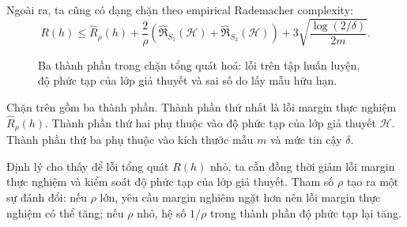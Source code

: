 Ngoài ra, ta cũng có dạng chặn theo empirical Rademacher complexity:
\begin{equation}
    R(h)
    \leq
    \widehat{R}_{\rho}(h)
    +
    \frac{2}{\rho}
    \left(
        \widehat{\mathfrak{R}}_{S_1}(\mathcal{H})
        +
        \widehat{\mathfrak{R}}_{S_2}(\mathcal{H})
    \right)
    +
    3
    \sqrt{
        \frac{\log(2/\delta)}{2m}
    }.
    \label{eq:section3-margin-bound-empirical}
\end{equation}

\begin{figure}[H]
    \centering
    \caption{Ba thành phần trong chặn tổng quát hoá: lỗi trên tập huấn luyện, độ phức tạp của lớp giả thuyết và sai số do lấy mẫu hữu hạn.}
    \label{fig:section3-margin-bound-components}
\end{figure}

Chặn trên gồm ba thành phần. Thành phần thứ nhất là lỗi margin thực nghiệm \(\widehat{R}_{\rho}(h)\). Thành phần thứ hai phụ thuộc vào độ phức tạp của lớp giả thuyết \(\mathcal{H}\). Thành phần thứ ba phụ thuộc vào kích thước mẫu \(m\) và mức tin cậy \(\delta\).

Định lý cho thấy để lỗi tổng quát \(R(h)\) nhỏ, ta cần đồng thời giảm lỗi margin thực nghiệm và kiểm soát độ phức tạp của lớp giả thuyết. Tham số \(\rho\) tạo ra một sự đánh đổi: nếu \(\rho\) lớn, yêu cầu margin nghiêm ngặt hơn nên lỗi margin thực nghiệm có thể tăng; nếu \(\rho\) nhỏ, hệ số \(1/\rho\) trong thành phần độ phức tạp lại tăng.

